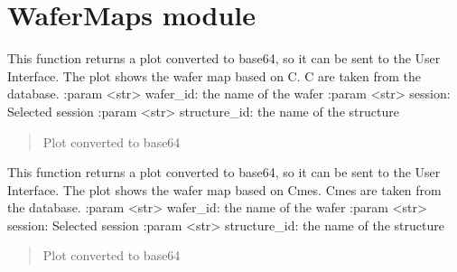 \documentclass[letterpaper,10pt,english]{sphinxmanual}
\begin{document}
\sphinxstepscope


\chapter{WaferMaps module}
\label{\detokenize{WaferMaps:module-WaferMaps}}\label{\detokenize{WaferMaps:wafermaps-module}}\label{\detokenize{WaferMaps::doc}}

\begin{fulllineitems}
\label{\detokenize{WaferMaps:WaferMaps.C_wafer_map}}
\pysigstartsignatures
{}
\pysigstopsignatures
\sphinxAtStartPar
This function returns a plot converted to base64, so it can be sent to the User Interface. The plot shows the wafer map based on C.
C are taken from the database.
:param \textless{}str\textgreater{} wafer\_id: the name of the wafer
:param \textless{}str\textgreater{} session: Selected session
:param \textless{}str\textgreater{} structure\_id: the name of the structure
\begin{quote}\begin{description}
\sphinxAtStartPar
Plot converted to base64

\end{description}\end{quote}

\end{fulllineitems}


\begin{fulllineitems}
\label{\detokenize{WaferMaps:WaferMaps.Cmes_wafer_map}}
\pysigstartsignatures
{}
\pysigstopsignatures
\sphinxAtStartPar
This function returns a plot converted to base64, so it can be sent to the User Interface. The plot shows the wafer map based on Cmes.
Cmes are taken from the database.
:param \textless{}str\textgreater{} wafer\_id: the name of the wafer
:param \textless{}str\textgreater{} session: Selected session
:param \textless{}str\textgreater{} structure\_id: the name of the structure
\begin{quote}\begin{description}
\sphinxAtStartPar
Plot converted to base64

\end{description}\end{quote}

\end{fulllineitems}
\end{document}

